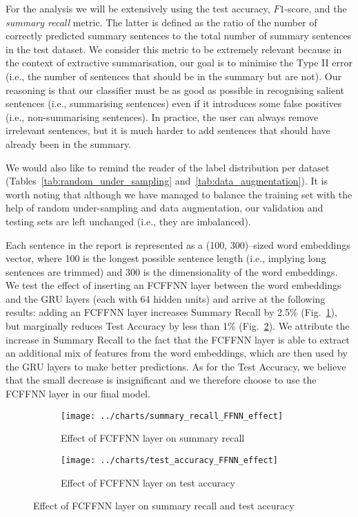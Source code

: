 For the analysis we will be extensively using the test accuracy, $F1$-score, and the \emph{summary recall} metric.
The latter is defined as the ratio of the number of correctly predicted summary sentences to the total number of summary sentences in the test dataset.
We consider this metric to be extremely relevant because in the context of extractive summarisation, our goal is to minimise the Type II error (i.e., the number of sentences that should be in the summary but are not).
Our reasoning is that our classifier must be as good as possible in recognising salient sentences (i.e., summarising sentences) even if it introduces some false positives (i.e., non-summarising sentences).
In practice, the user can always remove irrelevant sentences, but it is much harder to add sentences that should have already been in the summary.

We would also like to remind the reader of the label distribution per dataset (Tables~\ref{tab:random_under_sampling} and~\ref{tab:data_augmentation}).
It is worth noting that although we have managed to balance the training set with the help of random under-sampling and data augmentation,
our validation and testing sets are left unchanged (i.e., they are imbalanced).

Each sentence in the report is represented as a (100, 300)--sized word embeddings vector, where 100 is the longest possible sentence length (i.e., implying long sentences are trimmed) and 300 is the dimensionality of the word embeddings.
We test the effect of inserting an FCFFNN layer between the word embeddings and the GRU layers (each with 64 hidden units) and arrive at the following results:
adding an FCFFNN layer increases Summary Recall by 2.5\% (Fig.~\ref{fig:summary_recall_FFNN_effect}), but marginally reduces Test Accuracy by less than 1\% (Fig.~\ref{fig:test_accuracy_FFNN_effect}).
We attribute the increase in Summary Recall to the fact that the FCFFNN layer is able to extract an additional mix of features from the word embeddings, which are then used by the GRU layers to make better predictions.
As for the Test Accuracy, we believe that the small decrease is insignificant and we therefore choose to use the FCFFNN layer in our final model.

\begin{figure}[ht]
    \begin{subfigure}{0.49\textwidth}
        \centering \texttt{[image: ../charts/summary\_recall\_FFNN\_effect]}
        \caption{Effect of FCFFNN layer on summary recall}
        \label{fig:summary_recall_FFNN_effect}
    \end{subfigure}%
    \hfill
    \begin{subfigure}{0.49\textwidth}
        \centering
        \texttt{[image: ../charts/test\_accuracy\_FFNN\_effect]}
        \caption{Effect of FCFFNN layer on test accuracy}
        \label{fig:test_accuracy_FFNN_effect}
    \end{subfigure}
    \caption{Effect of FCFFNN layer on summary recall and test accuracy}
    \label{fig:FCFFNN}
\end{figure}


